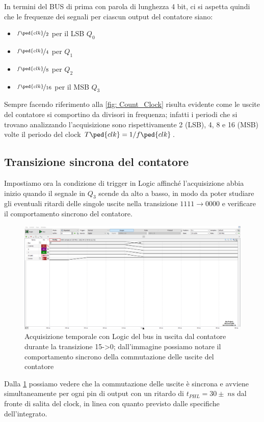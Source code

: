 \documentclass[10pt, a4paper, italian]{article}
\begin{document}
In termini del BUS di prima con parola di lunghezza 4 bit, ci si aspetta
quindi che le frequenze dei segnali per ciascun output del contatore siano:
\begin{itemize}
\item $\nicefrac{f\ped{clk}}{2}$ per il LSB $Q_0$
\item $\nicefrac{f\ped{clk}}{4}$ per $Q_1$
\item $\nicefrac{f\ped{clk}}{8}$ per $Q_2$
\item $\nicefrac{f\ped{clk}}{16}$ per il MSB $Q_3$
\end{itemize}
Sempre facendo riferimento alla \cref{fig: Count_Clock} risulta evidente come
le uscite del contatore si comportino da divisori in frequenza; infatti i
periodi che si trovano analizzando l'acquisizione sono rispettivamente 2 (LSB),
4, 8 e 16 (MSB) volte il periodo del clock $T\ped{clk} = 1/f\ped{clk}$.

\subsection{Transizione sincrona del contatore}
\label{sec: count_trans}
Impostiamo ora la condizione di trigger in Logic affinché l'acquisizione abbia
inizio quando il segnale in $Q_3$ scende da alto a basso, in modo da poter
studiare gli eventuali ritardi delle singole uscite nella transizione
$1111 \to 0000$ e verificare il comportamento sincrono del contatore.
\begin{figure}[htbp]
\centering
	\includegraphics[width=\textwidth]{5.d}
	\caption{Acquisizione temporale con Logic del bus in uscita dal contatore durante la transizione 15->0; dall'immagine possiamo notare il comportamento sincrono della commutazione delle uscite del contatore \label{fig: Count_150}}
\end{figure}

Dalla \cref{fig: Count_150} possiamo vedere che la commutazione delle uscite è
sincrona e avviene simultaneamente per ogni pin di output con un ritardo di
$t_{PHL} = 30 \pm \; \si{n\s}$ dal fronte di salita del clock, in linea con
quanto previsto dalle specifiche dell'integrato.
\end{document}
